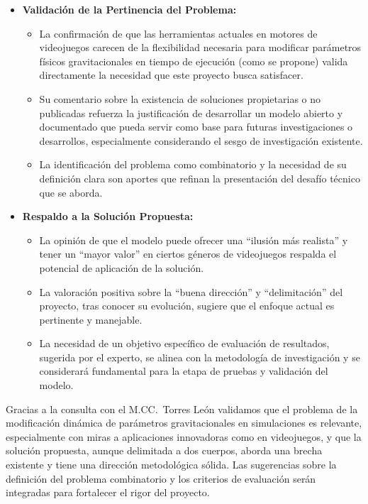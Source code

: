 \begin{itemize}
    \item \textbf{Validación de la Pertinencia del Problema:}
    \begin{itemize}
        \item La confirmación de que las herramientas actuales en motores de videojuegos carecen de la flexibilidad necesaria para modificar parámetros físicos gravitacionales en tiempo de ejecución (como se propone) valida directamente la necesidad que este proyecto busca satisfacer.
        \item Su comentario sobre la existencia de soluciones propietarias o no publicadas refuerza la justificación de desarrollar un modelo abierto y documentado que pueda servir como base para futuras investigaciones o desarrollos, especialmente considerando el sesgo de investigación existente.
        \item La identificación del problema como combinatorio y la necesidad de su definición clara son aportes que refinan la presentación del desafío técnico que se aborda.
    \end{itemize}

    \item \textbf{Respaldo a la Solución Propuesta:}
    \begin{itemize}
        \item La opinión de que el modelo puede ofrecer una ``ilusión más realista'' y tener un ``mayor valor'' en ciertos géneros de videojuegos respalda el potencial de aplicación de la solución.
        \item La valoración positiva sobre la ``buena dirección'' y ``delimitación'' del proyecto, tras conocer su evolución, sugiere que el enfoque actual es pertinente y manejable.
        \item La necesidad de un objetivo específico de evaluación de resultados, sugerida por el experto, se alinea con la metodología de investigación y se considerará fundamental para la etapa de pruebas y validación del modelo.
    \end{itemize}
\end{itemize}

Gracias a la consulta con el M.CC.\ Torres León validamos que el problema de la modificación dinámica de parámetros gravitacionales en simulaciones es relevante, especialmente con miras a aplicaciones innovadoras como en videojuegos, y que la solución propuesta, aunque delimitada a dos cuerpos, aborda una brecha existente y tiene una dirección metodológica sólida. Las sugerencias sobre la definición del problema combinatorio y los criterios de evaluación serán integradas para fortalecer el rigor del proyecto.